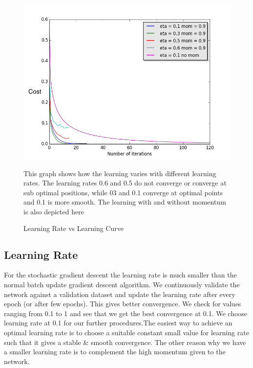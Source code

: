 \documentclass[conference]{IEEEtran}
\begin{document}
\begin{figure}[h!]
\centering
\includegraphics[scale=0.45]{learningRate.png}
\caption{Learning Rate vs Learning Curve}
\label{learning rate vs learning curve graph}
\footnotesize{This graph shows how the learning varies with different learning rates. The learning rates 0.6 and 0.5 do not converge or converge at sub optimal positions, while 03 and 0.1 converge at optimal points and 0.1 is more smooth. The learning with and without momentum is also depicted here}
\end{figure}



\subsection{Learning Rate}
For the stochastic gradient descent the learning rate is much smaller than the normal batch update gradient descent algorithm. We continuously validate the network against a validation dataset and update the learning rate after every epoch (or after few epochs). This gives better convergence. We check for values ranging from 0.1 to 1 and see that we get the best convergence at 0.1. We choose learning rate at 0.1 for our further procedures.The easiest way to achieve an optimal learning rate is to choose a suitable constant small value for learning rate such that it gives a stable \& smooth convergence.  The other reason why we have a smaller learning rate is to complement the high momentum given to the network.
\end{document}
